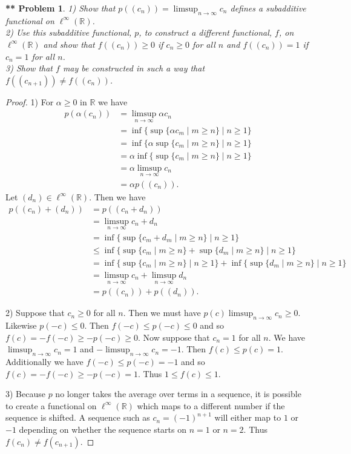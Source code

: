 \documentclass{article}
\newtheorem{**}{** Problem}
\begin{document}
\begin{flushleft}
\begin{**}
1) Show that $p((c_n)) = \limsup_{n \rightarrow \infty} c_n$ defines a subadditive functional on $\ell^{\infty} (\mathbb{R})$.\\
2) Use this subadditive functional, $p$, to construct a different functional, $f$, on $\ell^{\infty} (\mathbb{R})$ and show that $f((c_n)) \geq 0$ if $c_n \geq 0$ for all $n$ and $f((c_n)) = 1$ if $c_n = 1$ for all $n$.\\
3) Show that $f$ may be constructed in such a way that $f((c_{n+1})) \neq f((c_n))$.
\end{**}
\begin{proof}
1) For $\alpha \geq 0$ in $\mathbb{R}$ we have
\begin{align*}
p(\alpha (c_n))
&= \limsup_{n \rightarrow \infty} \alpha c_n\\
&= \inf \{ \sup \{\alpha c_m \mid m \geq n\} \mid n \geq 1\}\\
&= \inf \{ \alpha \sup \{c_m \mid m \geq n\} \mid n \geq 1\}\\
&= \alpha \inf \{ \sup \{c_m \mid m \geq n\} \mid n \geq 1\}\\
&= \alpha \limsup_{n \rightarrow \infty} c_n\\
&= \alpha p((c_n)).
\end{align*}
Let $(d_n) \in \ell^{\infty} (\mathbb{R})$. Then we have
\begin{align*}
p((c_n) + (d_n))
&= p((c_n + d_n))\\
&= \limsup_{n \rightarrow \infty} c_n + d_n\\
&= \inf \{ \sup \{c_m + d_m \mid m \geq n\} \mid n \geq 1\}\\
&\leq \inf \{ \sup \{c_m \mid m \geq n\} + \sup \{d_m \mid m \geq n\} \mid n \geq 1\}\\
&= \inf \{ \sup \{c_m \mid m \geq n\} \mid n \geq 1\} + \inf \{ \sup \{d_m \mid m \geq n\} \mid n \geq 1\}\\
&= \limsup_{n \rightarrow \infty} c_n + \limsup_{n \rightarrow \infty} d_n\\
&= p((c_n)) + p((d_n)).
\end{align*}\newline

2) Suppose that $c_n \geq 0$ for all $n$. Then we must have $p(c) \limsup_{n \rightarrow \infty} c_n \geq 0$. Likewise $p(-c) \leq 0$. Then $f(-c) \leq p(-c) \leq 0$ and so $f(c) = -f(-c) \geq -p(-c) \geq 0$. Now suppose that $c_n = 1$ for all $n$. We have $\limsup_{n \rightarrow \infty} c_n = 1$ and $-\limsup_{n \rightarrow \infty} c_n = -1$. Then $f(c) \leq p(c) = 1$. Additionally we have $f(-c) \leq p(-c) = -1$ and so $f(c) = -f(-c) \geq -p(-c) = 1$. Thus $1 \leq f(c) \leq 1$.\newline

3) Because $p$ no longer takes the average over terms in a sequence, it is possible to create a functional on $\ell^{\infty} (\mathbb{R})$ which maps to a different number if the sequence is shifted. A sequence such as $c_n = (-1)^{n+1}$ will either map to $1$ or $-1$ depending on whether the sequence starts on $n = 1$ or $n = 2$. Thus $f(c_n) \neq f(c_{n+1})$.
\end{proof}

\end{flushleft}
\end{document}
